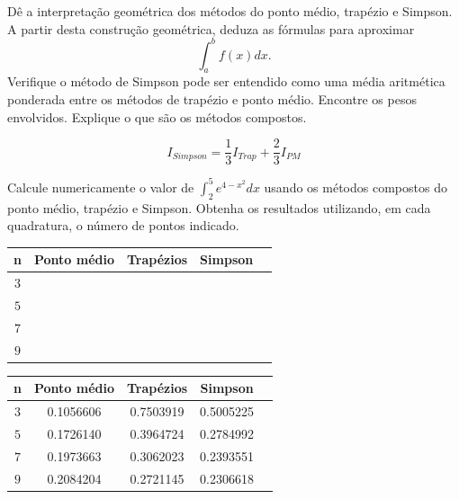 \begin{Exercise}
 Dê a interpretação geométrica dos métodos do ponto médio, trapézio e Simpson. A partir desta construção geométrica, deduza as fórmulas para aproximar 
 $$\int_a^bf(x)dx.$$
 Verifique o método de Simpson pode ser entendido como uma média aritmética ponderada entre os métodos de trapézio e ponto médio. Encontre os pesos envolvidos. Explique o que são os métodos compostos.
 \end{Exercise}
\begin{Answer}
  \begin{tiny}
$$ I_{Simpson}= \frac{1}{3} I_{Trap}+ \frac{2}{3}I_{PM}$$    
  \end{tiny}
\end{Answer}


\begin{Exercise} Calcule numericamente o valor de $\int_2^5e^{4-x^2}dx$ usando os métodos compostos do ponto médio, trapézio e Simpson. Obtenha os resultados utilizando, em cada quadratura, o número de pontos indicado.
\begin{center}
\begin{tabular}{|c|c|c|c|c|}
\hline
n   & Ponto médio & Trapézios & Simpson \\
\hline
$3$ &~\hspace{40pt}~& ~\hspace{40pt}~& ~\hspace{40pt}\\
\hline
$5 $ & & & \\
\hline
$7 $ & & &\\
\hline
$9$  & & &\\
\hline
\end{tabular}
\end{center}
\end{Exercise}
\begin{Answer}
  \begin{tiny}
\begin{center}
\begin{tabular}{|c|c|c|c|c|}
\hline
n   & Ponto médio & Trapézios & Simpson \\
\hline
$3$ & 0.1056606  &  0.7503919  &  0.5005225  \\
\hline
$5 $ & 0.1726140 &   0.3964724  &  0.2784992   \\
\hline
$7 $ & 0.1973663 &   0.3062023  &  0.2393551  \\
\hline
$9$  &  0.2084204 &   0.2721145  &  0.2306618  \\
\hline
\end{tabular}
\end{center}    
  \end{tiny}
\end{Answer}


